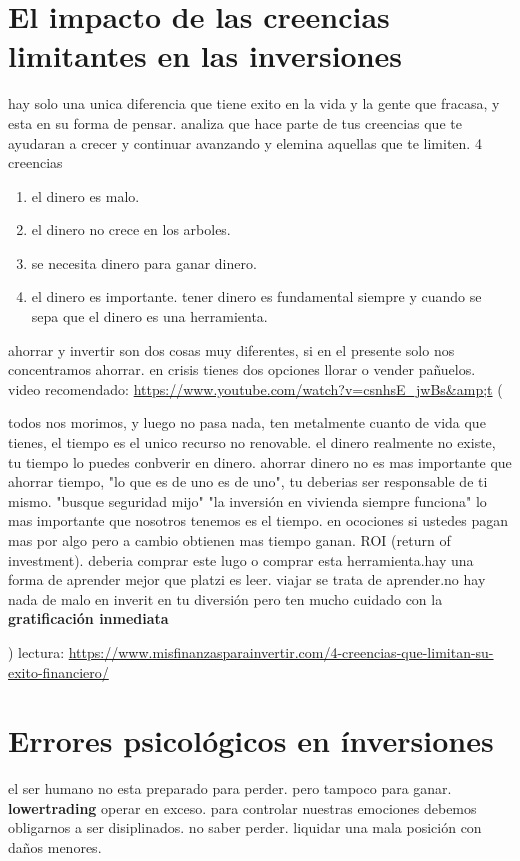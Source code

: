 \documentclass{article}
\begin{document}
    \section{El impacto de las creencias limitantes en las inversiones}
    hay solo una unica diferencia que tiene exito en la vida y la gente que fracasa, y esta en su forma de pensar.
    analiza que hace parte de tus creencias que te ayudaran a crecer y continuar avanzando y elemina aquellas que te limiten.
    4 creencias \begin{enumerate}
        \item el dinero es malo.
        \item el dinero no crece en los arboles. 
        \item se necesita dinero para ganar dinero.
        \item el dinero es importante. tener dinero es fundamental siempre y cuando se sepa que el dinero es una herramienta.
    \end{enumerate}
    ahorrar y invertir son dos cosas muy diferentes, si en el presente solo nos concentramos ahorrar. 
    en crisis tienes dos opciones llorar o vender pañuelos.
    video recomendado: \url{https://www.youtube.com/watch?v=csnhsE_jwBs&amp;t}
    (\begin{center}
        todos nos morimos, y luego no pasa nada, ten metalmente cuanto de vida que tienes, el tiempo es el unico recurso no renovable.
        el dinero realmente no existe, tu tiempo lo puedes conbverir en dinero.
        ahorrar dinero no es mas importante que ahorrar tiempo, "lo que es de uno es de uno", tu deberias ser responsable de ti mismo.
        "busque seguridad mijo" "la inversión en vivienda siempre funciona" lo mas importante que nosotros tenemos es el tiempo.
        en ocociones si ustedes pagan mas por algo pero a cambio obtienen mas tiempo ganan. ROI (return of investment).
        deberia comprar este lugo o comprar esta herramienta.hay una forma de aprender mejor que platzi es leer.
        viajar se trata de aprender.no hay nada de malo en inverit en tu diversión pero ten mucho cuidado con la \textbf{gratificación inmediata}
    \end{center})
    lectura:
    \url{https://www.misfinanzasparainvertir.com/4-creencias-que-limitan-su-exito-financiero/}
    \section{Errores psicológicos en ínversiones}
    el ser humano no esta preparado para perder. pero tampoco para ganar.
    \textbf{lowertrading} operar en exceso. para controlar nuestras emociones debemos obligarnos a ser disiplinados.
    no saber perder. liquidar una mala posición con daños menores.
\end{document}
